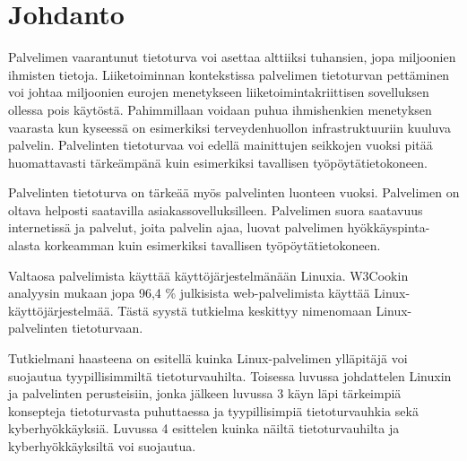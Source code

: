 \chapter{Johdanto}\label{Johdanto}

    Palvelimen vaarantunut tietoturva voi asettaa alttiiksi tuhansien, jopa miljoonien ihmisten tietoja. Liiketoiminnan kontekstissa palvelimen tietoturvan pettäminen voi johtaa miljoonien eurojen menetykseen liiketoimintakriittisen sovelluksen ollessa pois käytöstä. Pahimmillaan voidaan puhua ihmishenkien menetyksen vaarasta kun kyseessä on esimerkiksi terveydenhuollon infrastruktuuriin kuuluva palvelin. Palvelinten tietoturvaa voi edellä mainittujen seikkojen vuoksi pitää huomattavasti tärkeämpänä kuin esimerkiksi tavallisen työpöytätietokoneen.

    Palvelinten tietoturva on tärkeää myös palvelinten luonteen vuoksi. Palvelimen on oltava helposti saatavilla asiakassovelluksilleen. Palvelimen suora saatavuus internetissä ja palvelut, joita palvelin ajaa, luovat palvelimen hyökkäyspinta-alasta korkeamman kuin esimerkiksi tavallisen työpöytätietokoneen.

    Valtaosa palvelimista käyttää käyttöjärjestelmänään Linuxia. W3Cookin analyysin mukaan jopa 96,4 \% julkisista web-palvelimista käyttää Linux-käyttöjärjestelmää\cite{w3cook}. Tästä syystä tutkielma keskittyy nimenomaan Linux-palvelinten tietoturvaan.

    Tutkielmani haasteena on esitellä kuinka Linux-palvelimen ylläpitäjä voi suojautua tyypillisimmiltä tietoturvauhilta. Toisessa luvussa johdattelen Linuxin ja palvelinten perusteisiin, jonka jälkeen luvussa 3 käyn läpi tärkeimpiä konsepteja tietoturvasta puhuttaessa ja tyypillisimpiä tietoturvauhkia sekä kyberhyökkäyksiä. Luvussa 4 esittelen kuinka näiltä tietoturvauhilta ja kyberhyökkäyksiltä voi suojautua.
